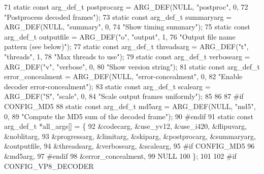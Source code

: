 \begin{DoxyCodeInclude}
71 \textcolor{keyword}{static} \textcolor{keyword}{const} arg\_def\_t postprocarg = ARG\_DEF(NULL, \textcolor{stringliteral}{"postproc"}, 0,
72                                              \textcolor{stringliteral}{"Postprocess decoded frames"});
73 \textcolor{keyword}{static} \textcolor{keyword}{const} arg\_def\_t summaryarg = ARG\_DEF(NULL, \textcolor{stringliteral}{"summary"}, 0,
74                                             \textcolor{stringliteral}{"Show timing summary"});
75 \textcolor{keyword}{static} \textcolor{keyword}{const} arg\_def\_t outputfile = ARG\_DEF(\textcolor{stringliteral}{"o"}, \textcolor{stringliteral}{"output"}, 1,
76                                             \textcolor{stringliteral}{"Output file name pattern (see below)"});
77 \textcolor{keyword}{static} \textcolor{keyword}{const} arg\_def\_t threadsarg = ARG\_DEF(\textcolor{stringliteral}{"t"}, \textcolor{stringliteral}{"threads"}, 1,
78                                             \textcolor{stringliteral}{"Max threads to use"});
79 \textcolor{keyword}{static} \textcolor{keyword}{const} arg\_def\_t verbosearg = ARG\_DEF(\textcolor{stringliteral}{"v"}, \textcolor{stringliteral}{"verbose"}, 0,
80                                             \textcolor{stringliteral}{"Show version string"});
81 \textcolor{keyword}{static} \textcolor{keyword}{const} arg\_def\_t error\_concealment = ARG\_DEF(NULL, \textcolor{stringliteral}{"error-concealment"}, 0,
82                                                    \textcolor{stringliteral}{"Enable decoder error-concealment"});
83 \textcolor{keyword}{static} \textcolor{keyword}{const} arg\_def\_t scalearg = ARG\_DEF(\textcolor{stringliteral}{"S"}, \textcolor{stringliteral}{"scale"}, 0,
84                                             \textcolor{stringliteral}{"Scale output frames uniformly"});
85 
86 
87 \textcolor{preprocessor}{#if CONFIG\_MD5}
88 \textcolor{keyword}{static} \textcolor{keyword}{const} arg\_def\_t md5arg = ARG\_DEF(NULL, \textcolor{stringliteral}{"md5"}, 0,
89                                         \textcolor{stringliteral}{"Compute the MD5 sum of the decoded frame"});
90 \textcolor{preprocessor}{#endif}
91 \textcolor{keyword}{static} \textcolor{keyword}{const} arg\_def\_t *all\_args[] = \{
92   &codecarg, &use\_yv12, &use\_i420, &flipuvarg, &noblitarg,
93   &progressarg, &limitarg, &skiparg, &postprocarg, &summaryarg, &outputfile,
94   &threadsarg, &verbosearg, &scalearg,
95 \textcolor{preprocessor}{#if CONFIG\_MD5}
96   &md5arg,
97 \textcolor{preprocessor}{#endif}
98   &error\_concealment,
99   NULL
100 \};
101 
102 \textcolor{preprocessor}{#if CONFIG\_VP8\_DECODER}

\end{DoxyCodeInclude}
